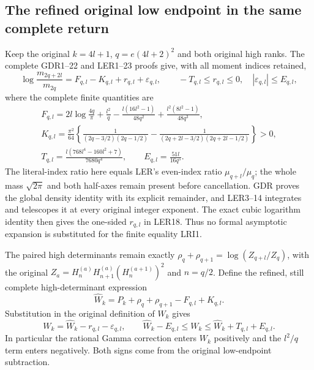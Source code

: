\documentclass[11pt,a4paper]{article}
\begin{document}
\subsection{The refined original low endpoint in the same complete return}

Keep the original $k=4l+1$, $q=e(4l+2)^2$ and both original
high ranks. The complete GDR1--22 and LER1--23 proofs give,
with all moment indices retained,
\[
 \log\frac{m_{2q+2l}}{m_{2q}}
 =F_{q,l}-K_{q,l}+r_{q,l}+\varepsilon_{q,l},\qquad
 -T_{q,l}\leq r_{q,l}\leq0,\quad
 |\varepsilon_{q,l}|\leq E_{q,l},
 \tag{LRI1}
\]
where the complete finite quantities are
\[
\begin{gathered}
 F_{q,l}=2l\log\frac{4q}{\pi}+\frac{l^2}{q}
 -\frac{l(16l^2-1)}{48q^2}
 +\frac{l^2(8l^2-1)}{48q^3},\\
 K_{q,l}=\frac{\pi^2}{64}\left\{
 \frac1{(2q-3/2)(2q-1/2)}
 -\frac1{(2q+2l-3/2)(2q+2l-1/2)}\right\}>0,\\
 T_{q,l}=\frac{l(768l^4-160l^2+7)}{7680q^4},\qquad
 E_{q,l}=\frac{51l}{16q^5}.
\end{gathered}\tag{LRI2}
\]
The literal-index ratio here equals LER's even-index ratio
$\mu_{q+l}/\mu_q$; the whole mass $\sqrt{2\pi}$ and both
half-axes remain present before cancellation. GDR proves the
global density identity with its explicit remainder, and LER3--14
integrates and telescopes it at every original integer exponent.
The exact cubic logarithm identity then gives the one-sided
$r_{q,l}$ in LER18. Thus no formal asymptotic expansion is
substituted for the finite equality LRI1.

The paired high determinants remain exactly
$\rho_q+\rho_{q+1}=\log(Z_{q+l}/Z_q)$, with the original
$Z_a=H_n^{(a)}H_{n+1}^{(a)}(H_n^{(a+1)})^2$ and $n=q/2$.
Define the refined, still complete high-determinant expression
\[
 \widehat W_k=P_k+\rho_q+\rho_{q+1}-F_{q,l}+K_{q,l}.
\]
Substitution in the original definition of $W_k$ gives
\[
 W_k=\widehat W_k-r_{q,l}-\varepsilon_{q,l},\qquad
 \widehat W_k-E_{q,l}\leq W_k
                  \leq\widehat W_k+T_{q,l}+E_{q,l}.
 \tag{LRI3}
\]
In particular the rational Gamma correction enters $W_k$
positively and the $l^2/q$ term enters negatively. Both signs
come from the original low-endpoint subtraction.
\end{document}
